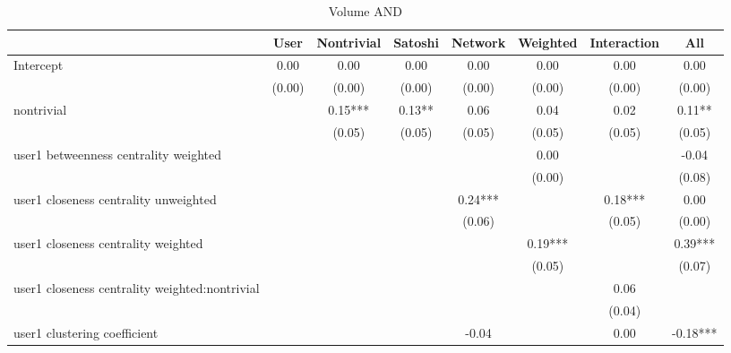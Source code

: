 \begin{table*}
\centering
\caption{Volume AND}
\begin{center}
\begin{tabular}{lccccccc}
\hline
                                               & User    & Nontrivial & Satoshi & Network & Weighted & Interaction &   All     \\
\hline
\hline

Intercept                                      & 0.00     & 0.00       & 0.00    & 0.00    & 0.00     & 0.00               & 0.00      \\
                                               & (0.00)   & (0.00)     & (0.00)  & (0.00)  & (0.00)   & (0.00)             & (0.00)    \\
nontrivial                                     &          & 0.15***    & 0.13**  & 0.06    & 0.04     & 0.02               & 0.11**    \\
                                               &          & (0.05)     & (0.05)  & (0.05)  & (0.05)   & (0.05)             & (0.05)    \\
user1 betweenness centrality weighted          &          &            &         &         & 0.00     &                    & -0.04     \\
                                               &          &            &         &         & (0.00)   &                    & (0.08)    \\
user1 closeness centrality unweighted          &          &            &         & 0.24*** &          & 0.18***            & 0.00      \\
                                               &          &            &         & (0.06)  &          & (0.05)             & (0.00)    \\
user1 closeness centrality weighted            &          &            &         &         & 0.19***  &                    & 0.39***   \\
                                               &          &            &         &         & (0.05)   &                    & (0.07)    \\
user1 closeness centrality weighted:nontrivial &          &            &         &         &          & 0.06               &           \\
                                               &          &            &         &         &          & (0.04)             &           \\
user1 clustering coefficient                   &          &            &         & -0.04   &          & 0.00               & -0.18***  \\

\end{tabular}
\end{center}
\end{table*}

